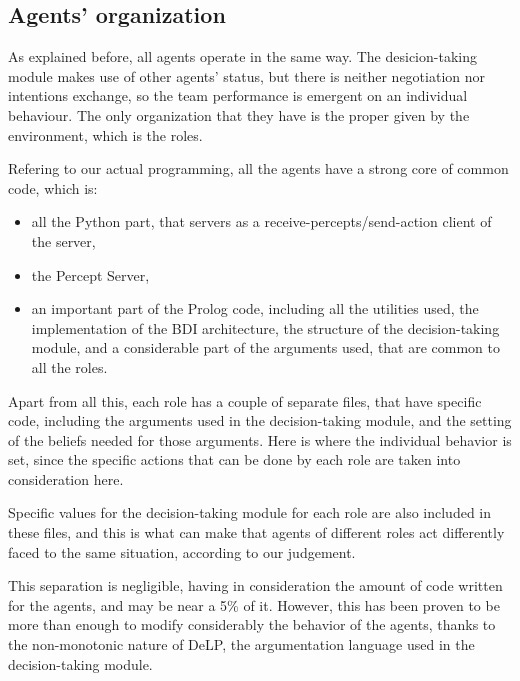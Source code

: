 \documentclass{llncs2e/llncs}
\begin{document}
\subsection{Agents' organization}

    As explained before, all agents operate in the same way. The desicion-taking
    module makes use of other agents' status, but there is neither negotiation nor 
    intentions exchange, so the team performance is emergent on an individual behaviour. 
    The only organization that they have is the proper given by the environment, 
    which is the roles.
    
    Refering to our actual programming, all the agents have a strong core of common
    code, which is:
    
    \begin{itemize}
    \item all the Python part, that servers as a receive-percepts/send-action client 
    of the server,
    
    \item the Percept Server,
    
    \item an important part of the Prolog code, including all the utilities used, the
    implementation of the BDI architecture, the structure of the 
    decision-taking module, and a considerable part of the arguments used, that
    are common to all the roles.
    \end{itemize}
    
    Apart from all this, each role has a couple of separate files, that have 
    specific code, including the arguments used in the decision-taking module, and
    the setting of the beliefs needed for those arguments. Here is where the 
    individual behavior is set, since the specific actions that can be done by each
    role are taken into consideration here.
    
    Specific values for the decision-taking module for each role are also included
    in these files, and this is what can make that agents of different roles act 
    differently faced to the same situation, according to our judgement.
    
    This separation is negligible, having in consideration the amount of code 
    written for the agents, and may be near a 5\% of it. However, this has been proven to
    be more than enough to modify considerably the behavior of the agents, thanks to
    the non-monotonic nature of DeLP, the argumentation language used in the 
    decision-taking module.
\end{document}
